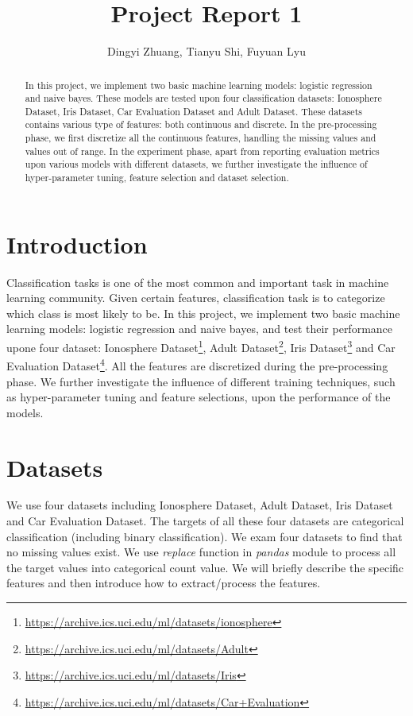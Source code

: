 \documentclass[11pt]{scrartcl}
\title{Project Report 1}
\author{Dingyi Zhuang, Tianyu Shi, Fuyuan Lyu}
\begin{document}
\maketitle

\begin{abstract}
In this project, we implement two basic machine learning models: logistic regression and naive bayes. These models are tested upon four classification datasets: Ionosphere Dataset, Iris Dataset, Car Evaluation Dataset and Adult Dataset. These datasets contains various type of features: both continuous and discrete. In the pre-processing phase, we first discretize all the continuous features, handling the missing values and values out of range. In the experiment phase, apart from reporting evaluation metrics upon various models with different datasets, we further investigate the influence of hyper-parameter tuning, feature selection and dataset selection.

\end{abstract}

\section{Introduction}
Classification tasks is one of the most common and important task in machine learning community. Given certain features, classification task is to categorize which class is most likely to be. In this project, we implement two basic machine learning models: logistic regression and naive bayes, and test their performance upone four dataset: Ionosphere Dataset\footnote{\url{https://archive.ics.uci.edu/ml/datasets/ionosphere}}, Adult Dataset\footnote{\url{https://archive.ics.uci.edu/ml/datasets/Adult}}, Iris Dataset\footnote{\url{https://archive.ics.uci.edu/ml/datasets/Iris}} and Car Evaluation Dataset\footnote{\url{https://archive.ics.uci.edu/ml/datasets/Car+Evaluation}}. All the features are discretized during the pre-processing phase. We further investigate the influence of different training techniques, such as hyper-parameter tuning and feature selections, upon the performance of the models.

\section{Datasets}
We use four datasets including Ionosphere Dataset, Adult Dataset, Iris Dataset and Car Evaluation Dataset. The targets of all these four datasets are categorical classification (including binary classification). We exam four datasets to find that no missing values exist. We use \textit{replace} function in \textit{pandas} module to process all the target values into categorical count value. We will briefly describe the specific features and then introduce how to extract/process the features.
\end{document}
